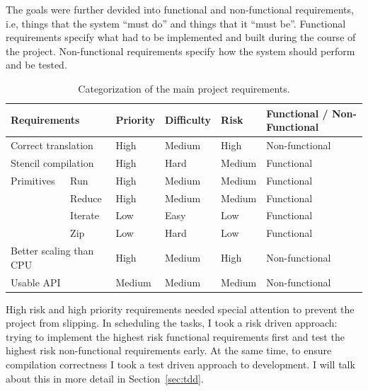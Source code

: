 \documentclass[12pt,a4paper,oneside]{scrbook}
\begin{document}
The goals were further devided into functional and non-functional requirements,
i.e, things that the system ``must do'' and things that it ``must
be''. Functional requirements specify what had to be implemented and built
during the course of the project. Non-functional requirements specify how the
system should perform and be tested.

\begin{table}
\caption{Categorization of the main project requirements.\label{tbl:reqanal}}
\begin{tabular}{|l|l|l|l|l|l|}
\hline
\multicolumn{2}{|l|}{Requirements}                       & Priority & Difficulty & Risk    & Functional / Non-Functional \\
\hline
\multicolumn{2}{|l|}{Correct translation}                & High     & Medium     & High    & Non-functional              \\
\hline
\multicolumn{2}{|l|}{Stencil compilation}                & High     & Hard       & Medium  & Functional                  \\
\hline
Primitives                                    & Run      & High     & Medium     & Medium  & Functional                  \\
\cline{3-6}
                                              & Reduce   & High     & Medium     & Medium  & Functional                  \\
\cline{3-6}
                                              & Iterate  & Low      & Easy       & Low     & Functional                  \\
\cline{3-6}
                                              & Zip      & Low      & Hard       & Low     & Functional                  \\
\hline
\multicolumn{2}{|l|}{Better scaling than CPU}            & High     & Medium     & High    & Non-functional              \\
\hline
\multicolumn{2}{|l|}{Usable API}                         & Medium   & Medium     & Medium  & Non-functional              \\
\hline
\end{tabular}
\end{table}

High risk and high priority requirements needed special attention to prevent the
project from slipping. In scheduling the tasks, I took a risk driven approach:
trying to implement the highest risk functional requirements first and test the
highest risk non-functional requirements early. At the same time, to ensure
compilation correctness I took a test driven approach to development. I will
talk about this in more detail in Section~\ref{sec:tdd}.
\end{document}

